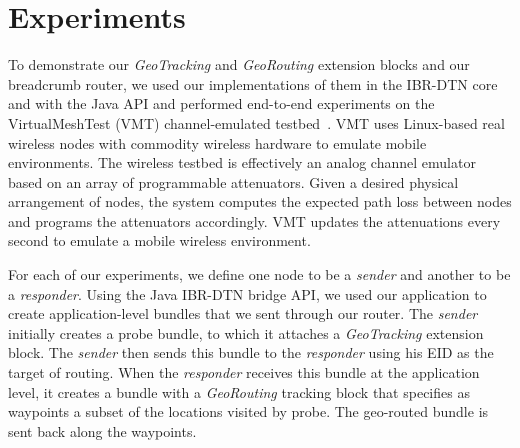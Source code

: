 \section{Experiments}\label{sec:experiments}
To demonstrate our {\em GeoTracking} and {\em GeoRouting} extension
blocks and our {\sc breadcrumb} router, we used our implementations of
them in the IBR-DTN core and with the Java API and performed
end-to-end experiments on the VirtualMeshTest (VMT) channel-emulated
testbed~\cite{hahn10:using}.  VMT uses Linux-based real
wireless nodes with commodity wireless hardware to emulate mobile
environments.  The wireless testbed is effectively an analog channel
emulator based on an array of programmable attenuators.  Given a
desired physical arrangement of nodes, the system computes the
expected path loss between nodes and programs the attenuators
accordingly.  VMT updates the attenuations every second to emulate a
mobile wireless environment.

For each of our experiments, we define one node to be a {\em
  sender} and another to be a {\em responder}. Using the Java IBR-DTN
bridge API, we used our application to create application-level
bundles that we sent through our router. The {\em sender} initially
creates a probe bundle, to which it attaches a {\em GeoTracking}
extension block. The {\em sender} then sends this bundle to the {\em
  responder} using his EID as the target of routing. When the {\em
  responder} receives this bundle at the application level, it creates
a bundle with a {\em GeoRouting} tracking block that specifies as
waypoints a subset of the locations visited by probe. The geo-routed
bundle is sent back along the waypoints.


